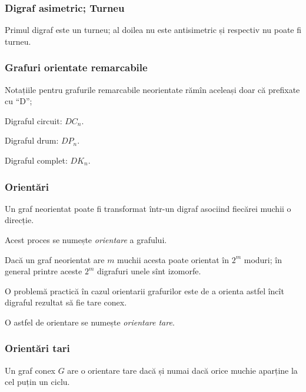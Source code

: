 \begin{frame}
  \frametitle{Digraf asimetric; Turneu}

\begin{figure}
\centering%
\end{figure}

Primul digraf este un turneu; al doilea nu este antisimetric și respectiv nu poate fi turneu.

\end{frame}

\begin{frame}
  \frametitle{Grafuri orientate remarcabile}

Notațiile pentru grafurile remarcabile neorientate rămîn aceleași doar că prefixate cu ``D'';

Digraful circuit: $DC_n$.

Digraful drum: $DP_n$.

Digraful complet: $DK_n$.
 
\end{frame}

\begin{frame}
  \frametitle{Orientări}

Un graf neorientat poate fi transformat într-un digraf asociind fiecărei muchii o direcție.

Acest proces se numește \emph{orientare} a grafului.

Dacă un graf neorientat are $m$ muchii acesta poate orientat în $2^m$ moduri; în general printre aceste $2^m$ digrafuri unele sînt izomorfe.

O problemă practică în cazul orientarii grafurilor este de a orienta astfel încît digraful rezultat să fie tare conex.

O astfel de orientare se numește \emph{orientare tare}.

\end{frame}

\begin{frame}
  \frametitle{Orientări tari}

\begin{theorem}
Un graf conex $G$ are o orientare tare dacă și numai dacă orice muchie aparține la cel puțin un ciclu. 
\end{theorem}

\end{frame}

